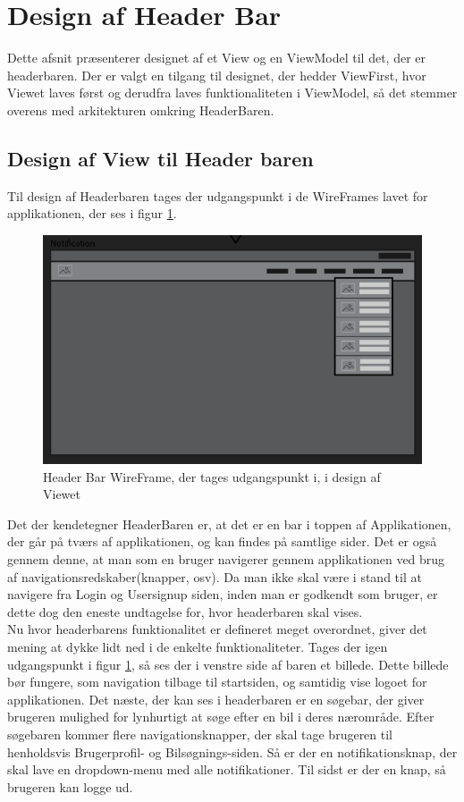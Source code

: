 \documentclass[SoftwareDesign/SoftwareDesign_main.tex]{subfiles}
\begin{document}
\section{Design af Header Bar}
Dette afsnit præsenterer designet af et View og en ViewModel til det, der er headerbaren. Der er valgt en tilgang til designet, der hedder ViewFirst, hvor Viewet laves først og derudfra laves funktionaliteten i ViewModel, så det stemmer overens med arkitekturen omkring HeaderBaren.
\subsection{Design af View til Header baren}
Til design af Headerbaren tages der udgangspunkt i de WireFrames lavet for applikationen, der ses i figur \ref{fig:headerbar_wf}. 
\begin{figure}[H]
    \centering
    \includegraphics[width=\textwidth]{SoftwareDesign/MVVMDesigns/Graphics/HeaderBarWireFrame.png}
    \caption{Header Bar WireFrame, der tages udgangspunkt i, i design af Viewet}
    \label{fig:headerbar_wf}
\end{figure}
Det der kendetegner HeaderBaren er, at det er en bar i toppen af Applikationen, der går på tværs af applikationen, og kan findes på samtlige sider. Det er også gennem denne, at man som en bruger navigerer gennem applikationen ved brug af navigationsredskaber(knapper, osv). Da man ikke skal være i stand til at navigere fra Login og Usersignup siden, inden man er godkendt som bruger, er dette dog den eneste undtagelse for, hvor headerbaren skal vises.\\

Nu hvor headerbarens funktionalitet er defineret meget overordnet, giver det mening at dykke lidt ned i de enkelte funktionaliteter. Tages der igen udgangspunkt i figur \ref{fig:headerbar_wf}, så ses der i venstre side af baren et billede. Dette billede bør fungere, som navigation tilbage til startsiden, og samtidig vise logoet for applikationen. Det næste, der kan ses i headerbaren er en søgebar, der giver brugeren mulighed for lynhurtigt at søge efter en bil i deres nærområde. Efter søgebaren kommer flere navigationsknapper, der skal tage brugeren til henholdsvis Brugerprofil- og Bilsøgnings-siden. Så er der en notifikationsknap, der skal lave en dropdown-menu med alle notifikationer. Til sidst er der en knap, så brugeren kan logge ud.
\end{document}
